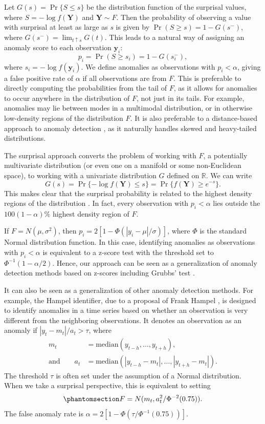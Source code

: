 \documentclass[
  12pt]{article}
\theoremstyle{definition}
\theoremstyle{plain}
\theoremstyle{plain}
\theoremstyle{plain}
\theoremstyle{remark}
\begin{document}
Let \(G(s) = \Pr\{S\le s\}\) be the distribution function of the
surprisal values, where \(S = -\log f(\bm{Y})\) and \(\bm{Y}\sim F\).
Then the probability of observing a value with surprisal at least as
large as \(s\) is given by \(\Pr(S\ge s) = 1-G(s^-)\), where
\(G(s^-) = \lim_{t\uparrow s} G(t)\). This leads to a natural way of
assigning an anomaly score to each observation \(\bm{y}_i\): \[
p_i = \Pr(S \ge s_i)  = 1-G(s_i^-),
\] where \(s_i = -\log f(\bm{y}_i)\). We define anomalies as
observations with \(p_i < \alpha\), giving a false positive rate of
\(\alpha\) if all observations are from \(F\). This is preferable to
directly computing the probabilities from the tail of \(F\), as it
allows for anomalies to occur anywhere in the distribution of \(F\), not
just in its tails. For example, anomalies may lie between modes in a
multimodal distribution, or in otherwise low-density regions of the
distribution \(F\). It is also preferable to a distance-based approach
to anomaly detection \citep[e.g.,][]{hdoutliers}, as it naturally
handles skewed and heavy-tailed distributions.

The surprisal approach converts the problem of working with \(F\), a
potentially multivariate distribution (or even one on a manifold or some
non-Euclidean space), to working with a univariate distribution \(G\)
defined on \(\mathbb{R}\). We can write \[
G(s) = \Pr\{-\log f(\bm{Y})\le s\} = \Pr\{ f(\bm{Y})\ge e^{-s}\}.
\] This makes clear that the surprisal probability is related to the
highest density regions of the distribution \citep{HDR96}. In fact,
every observation with \(p_i< \alpha\) lies outside the
\(100(1-\alpha)\)\% highest density region of \(F\).

If \(F = N(\mu, \sigma^2)\), then \(p_i = 2[1-\Phi(|y_i-\mu|/\sigma)]\),
where \(\Phi\) is the standard Normal distribution function. In this
case, identifying anomalies as observations with \(p_i < \alpha\) is
equivalent to a z-score test with the threshold set to
\(\Phi^{-1}(1-\alpha/2)\). Hence, our approach can be seen as a
generalization of anomaly detection methods based on z-scores including
Grubbs' test \citep{Grubbs1950}.

It can also be seen as a generalization of other anomaly detection
methods. For example, the Hampel identifier, due to a proposal of Frank
Hampel \citep{Davies1993}, is designed to identify anomalies in a time
series based on whether an observation is very different from the
neighboring observations. It denotes an observation as an anomaly if
\(|y_t-m_t|/a_t > \tau\), where \begin{align*}
m_t &= \text{median}(y_{t-h}, \dots, y_{t+h}), \\
\text{and}\qquad
a_t &= \text{median}(|y_{t-h}-m_t|, \dots, |y_{t+h}- m_t|).
\end{align*} The threshold \(\tau\) is often set under the assumption of
a Normal distribution. When we take a surprisal perspective, this is
equivalent to setting
\begin{equation}\protect\phantomsection\label{eq-hampel}{
  F = N(m_t, a^2_t/\Phi^{-2}(0.75)).
}\end{equation} The false anomaly rate is
\(\alpha = 2[1 - \Phi(\tau/\Phi^{-1}(0.75))]\).
\end{document}
